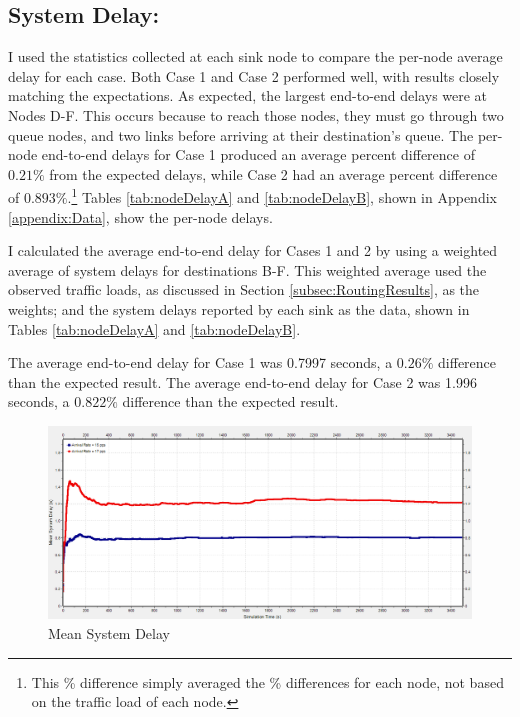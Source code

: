 \documentclass{article}
\begin{document}
\subsection{System Delay:}
\label{subsec:SysDelay}
I used the statistics collected at each sink node to compare the per-node average delay for each case.
Both Case 1 and Case 2 performed well, with results closely matching the expectations.  
As expected, the largest end-to-end delays were at Nodes D-F. 
This occurs because to reach those nodes, they must go through two queue nodes, and two links before arriving at their destination's queue.
The per-node end-to-end delays for Case 1 produced an average percent difference of $0.21\%$ from the expected delays, while Case 2 had an average percent difference of $0.893\%$.\footnote{This \% difference simply averaged the \% differences for each node, not based on the traffic load of each node.}
Tables \ref{tab:nodeDelayA} and \ref{tab:nodeDelayB}, shown in Appendix \ref{appendix:Data}, show the per-node delays.

I calculated the average end-to-end delay for Cases 1 and 2 by using a weighted average of system delays for destinations B-F.
This weighted average used the observed traffic loads, as discussed in Section \ref{subsec:RoutingResults}, as the weights; and the system delays reported by each sink as the data, shown in Tables \ref{tab:nodeDelayA} and \ref{tab:nodeDelayB}.

The average end-to-end delay for Case 1 was 0.7997 seconds, a $0.26 \%$ difference than the expected result.
The average end-to-end delay for Case 2 was 1.996 seconds, a $0.822 \%$ difference than the expected result.

\begin{figure}[h!]
\centering
\includegraphics[scale=0.5]{Images/MeanSysDelay.PNG}
\caption{Mean System Delay}
\label{fig:meanSysDelay}
\end{figure}
\end{document}
